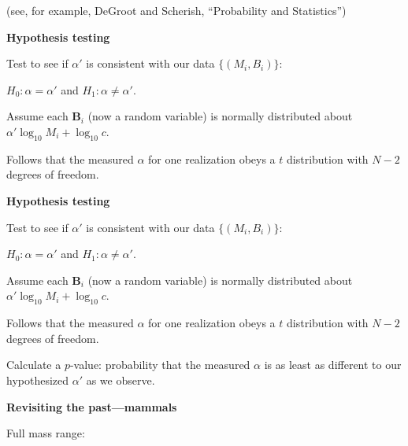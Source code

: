 {

{\tiny (see, for example, DeGroot and Scherish, ``Probability and Statistics'')}

\vis


  \textbf{Hypothesis testing}

Test to see if $\alpha'$ is consistent
with our data $\{(M_i,B_i)\}$:

$H_0: \alpha = \alpha'$ and $H_1: \alpha \ne \alpha'.$

Assume each $\mathbf{B}_i$ (now a random variable) 
is normally distributed
about $\alpha' \log_{10} M_i + \log_{10} c$.

Follows that the measured $\alpha$ for
one realization obeys
a $t$ distribution with $N-2$ degrees of freedom.


\inv 

{\tiny {}}

\vis


  \textbf{Hypothesis testing}

Test to see if $\alpha'$ is consistent
with our data $\{(M_i,B_i)\}$:

$H_0: \alpha = \alpha'$ and $H_1: \alpha \ne \alpha'.$

Assume each $\mathbf{B}_i$ (now a random variable) 
is normally distributed
about $\alpha' \log_{10} M_i + \log_{10} c$.

Follows that the measured $\alpha$ for
one realization obeys
a $t$ distribution with $N-2$ degrees of freedom.

Calculate a $p$-value: probability that the measured
$\alpha$ is as least as different to our hypothesized
$\alpha'$ as we observe.

{\tiny {}}


  \textbf{Revisiting the past---mammals}

    Full mass range:

}
